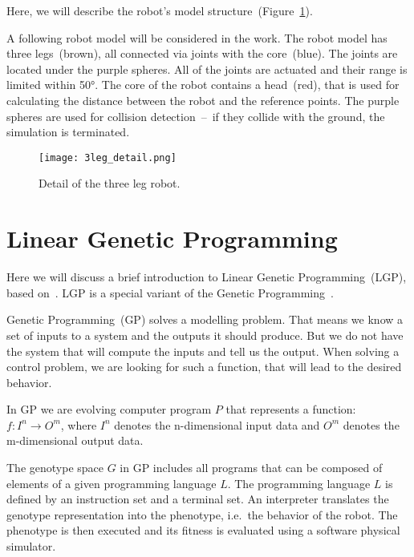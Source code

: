 \documentclass{ExcelAtFIT}
\begin{document}
Here, we will describe the robot's model structure~(Figure~\ref{fig:ThreeLegDetail}).

A following robot model will be considered in the work.
The robot model has three legs~(brown), all connected via joints with the core~(blue).
The joints are located under the purple spheres.
All of the joints are actuated and their range is limited within \ang{50}.
The core of the robot contains a head~(red), that is used for calculating the distance between the robot and the reference points.
The purple spheres are used for collision detection~--~if they collide with the ground, the simulation is terminated.

\begin{figure}[h]
	\centering
	{\texttt{[image: 3leg\_detail.png]}}
	\caption{
	Detail of the three leg robot.
	}
	\label{fig:ThreeLegDetail}
\end{figure}

\section{Linear Genetic Programming}
\label{sec:theory}
Here we will discuss a brief introduction to Linear Genetic Programming~(LGP), based on~\cite{Brameier2010}.
LGP is a special variant of the Genetic Programming~\cite{Koza1992}.

Genetic Programming~(GP) solves a modelling problem.
That means we know a set of inputs to a system and the outputs it should produce.
But we do not have the system that will compute the inputs and tell us the output.
When solving a control problem, we are looking for such a function, that will lead to the desired behavior.

In GP we are evolving computer program $P$ that represents a function: $f : I^n \to O^m$, where $I^n$ denotes the n-dimensional input data and $O^m$ denotes the m-dimensional output data.

The genotype space $G$ in GP includes all programs that can be composed of elements of a given programming language $L$.
The programming language $L$ is defined by an instruction set and a terminal set.
An interpreter translates the genotype representation into the phenotype, i.e.\ the behavior of the robot.
The phenotype is then executed and its fitness is evaluated using a software physical simulator.
\end{document}
